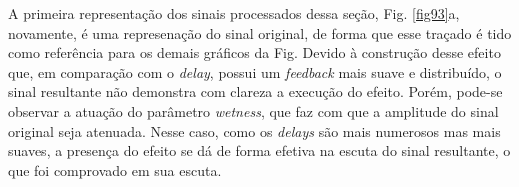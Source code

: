 A primeira representação dos sinais processados dessa seção, Fig. \ref{fig93}a, novamente, é uma represenação do sinal original, de forma que esse traçado é tido como referência para os demais gráficos da Fig. %
Devido à construção desse efeito que, em comparação com o \textit{delay}, possui um \textit{feedback} mais suave e distribuído, o sinal resultante não demonstra com clareza a execução do efeito. Porém, pode-se observar a atuação do parâmetro \textit{wetness}, que faz com que a amplitude do sinal original seja atenuada. Nesse caso, como os \textit{delays} são mais numerosos mas mais suaves, a presença do efeito se dá de forma efetiva na escuta do sinal resultante, o que foi comprovado em sua escuta.

